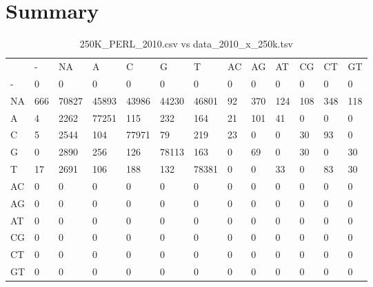 \section{Summary} \label{section_summary}
\begin{center}
\begin{longtable}{|l|l|l|l|l|l|l|l|l|l|l|l|l|}
\caption{250K\_PERL\_2010.csv vs data\_2010\_x\_250k.tsv} \label{table_dm0}\\
\hline
\\
\hline
&-&NA&A&C&G&T&AC&AG&AT&CG&CT&GT\\
-&0&0&0&0&0&0&0&0&0&0&0&0\\
NA&666&70827&45893&43986&44230&46801&92&370&124&108&348&118\\
A&4&2262&77251&115&232&164&21&101&41&0&0&0\\
C&5&2544&104&77971&79&219&23&0&0&30&93&0\\
G&0&2890&256&126&78113&163&0&69&0&30&0&30\\
T&17&2691&106&188&132&78381&0&0&33&0&83&30\\
AC&0&0&0&0&0&0&0&0&0&0&0&0\\
AG&0&0&0&0&0&0&0&0&0&0&0&0\\
AT&0&0&0&0&0&0&0&0&0&0&0&0\\
CG&0&0&0&0&0&0&0&0&0&0&0&0\\
CT&0&0&0&0&0&0&0&0&0&0&0&0\\
GT&0&0&0&0&0&0&0&0&0&0&0&0\\
\hline
\end{longtable}
\end{center}

